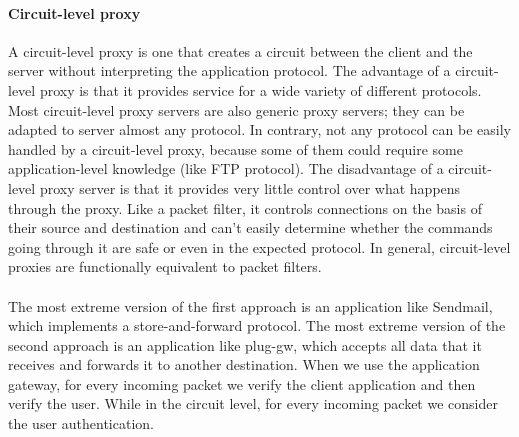 \documentclass[11pt]{article}
\begin{document}
\paragraph{Circuit-level proxy} A circuit-level proxy is one that creates a circuit between the client and the server without interpreting the application protocol. The advantage of a circuit-level proxy is that it provides service for a wide variety of different protocols. Most circuit-level proxy servers are also generic proxy servers; they can be adapted to server almost any protocol. In contrary, not any protocol can be easily handled by a circuit-level proxy, because some of them could require some application-level knowledge (like FTP protocol). The disadvantage of a circuit-level proxy server is that it provides very little control over what happens through the proxy. Like a packet filter, it controls connections on the basis of their source and destination and can't easily determine whether the commands going through it are safe or even in the expected protocol. In general, circuit-level proxies are functionally equivalent to packet filters.\\\\The most extreme version of the first approach is an application like Sendmail, which implements a store-and-forward protocol. The most extreme version of the second approach is an application like plug-gw, which accepts all data that it receives and forwards it to another destination. When we use the application gateway, for every incoming packet we verify the client application and then verify the user. While in the circuit level, for every incoming packet we consider the user authentication.
\end{document}

